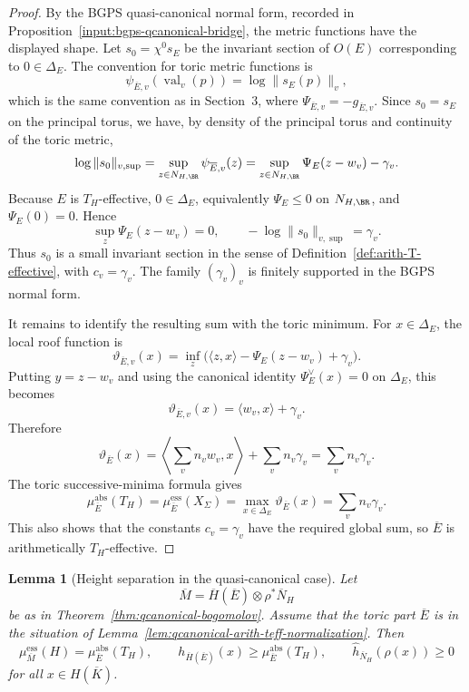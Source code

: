 \documentclass[10pt,a4paper]{amsart}
\theoremstyle{plain}
\newtheorem{lemma}[theorem]{Lemma}
\DeclareMathOperator{\val}{val}
\theoremstyle{plain}
\numberwithin{equation}{section}
\providecommand{\bN}{\overline{N}}
\providecommand{\bE}{\overline{E}}
\providecommand{\bM}{\overline{M}}
\providecommand{\muess}{\mu^{\mathrm{ess}}}
\providecommand{\muabs}{\mu^{\mathrm{abs}}}
\begin{document}
\begin{proof}
	By the BGPS quasi-canonical normal form, recorded in
	Proposition~\ref{input:bgps-qcanonical-bridge}, the metric functions have the
	displayed shape.  Let \(s_0=\chi^0s_E\) be the invariant section of \(O(E)\)
	corresponding to \(0\in\Delta_E\).  The convention for toric metric functions
	is
	\[
	\psi_{\bE,v}(\val_v(p))=\log\|s_E(p)\|_v,
	\]
	which is the same convention as in Section~3, where
	\(\Psi_{\bE,v}=-g_{\bE,v}\).  Since \(s_0=s_E\) on the principal torus, we
	have, by density of the principal torus and continuity of the toric metric,
	\[
	\log\|s_0\|_{v,\sup}
	=
	\sup_{z\in N_{H,\BR}}\psi_{\bE,v}(z)
	=
	\sup_{z\in N_{H,\BR}}\Psi_E(z-w_v)-\gamma_v .
	\]
	Because \(E\) is \(T_H\)-effective, \(0\in\Delta_E\), equivalently
	\(\Psi_E\le0\) on \(N_{H,\BR}\), and \(\Psi_E(0)=0\).  Hence
	\[
	\sup_z\Psi_E(z-w_v)=0,
	\qquad
	-\log\|s_0\|_{v,\sup}=\gamma_v .
	\]
	Thus \(s_0\) is a small invariant section in the sense of
	Definition~\ref{def:arith-T-effective}, with \(c_v=\gamma_v\).  The family
	\((\gamma_v)_v\) is finitely supported in the BGPS normal form.
	
	It remains to identify the resulting sum with the toric minimum.  For
	\(x\in\Delta_E\), the local roof function is
	\[
	\vartheta_{\bE,v}(x)
	=
	\inf_z\bigl(\langle z,x\rangle-\Psi_E(z-w_v)+\gamma_v\bigr).
	\]
	Putting \(y=z-w_v\) and using the canonical identity
	\(\Psi_E^\vee(x)=0\) on \(\Delta_E\), this becomes
	\[
	\vartheta_{\bE,v}(x)=\langle w_v,x\rangle+\gamma_v .
	\]
	Therefore
	\[
	\vartheta_{\bE}(x)
	=
	\left\langle \sum_vn_vw_v,x\right\rangle+\sum_vn_v\gamma_v
	=
	\sum_vn_v\gamma_v .
	\]
	The toric successive-minima formula
	\cite[Theorem 3.9 and Corollary 3.10]{BGPS15} gives
	\[
	\muabs_{\bE}(T_H)=\muess_{\bE}(X_\Sigma)
	=
	\max_{x\in\Delta_E}\vartheta_{\bE}(x)
	=
	\sum_vn_v\gamma_v .
	\]
	This also shows that the constants \(c_v=\gamma_v\) have the required global
	sum, so \(\bE\) is arithmetically \(T_H\)-effective.
\end{proof}

\begin{lemma}[Height separation in the quasi-canonical case]
	\label{lem:qbog-height-separation}
	Let
	\[
	\bM=\overline H(\bE)\otimes\rho^*\bN_H
	\]
	be as in Theorem~\ref{thm:qcanonical-bogomolov}.  Assume that the toric part \(\bE\) is in the
	situation of Lemma~\ref{lem:qcanonical-arith-teff-normalization}.  Then
	\[
	\muess_{\bM}(H)=\muabs_{\bE}(T_H),\qquad
	h_{\overline H(\bE)}(x)\ge\muabs_{\bE}(T_H),\qquad
	\hat h_{\bN_H}(\rho(x))\ge0
	\]
	for all \(x\in H(\overline K)\).
\end{lemma}
\end{document}

